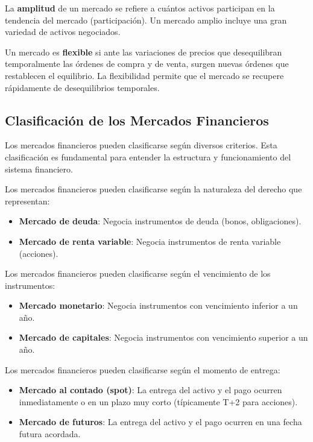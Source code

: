 \begin{definicion}[Amplitud]
La \textbf{amplitud} de un mercado se refiere a cuántos activos participan en la tendencia del mercado (participación). Un mercado amplio incluye una gran variedad de activos negociados.
\end{definicion}

\begin{definicion}[Flexibilidad]
Un mercado es \textbf{flexible} si ante las variaciones de precios que desequilibran temporalmente las órdenes de compra y de venta, surgen nuevas órdenes que restablecen el equilibrio. La flexibilidad permite que el mercado se recupere rápidamente de desequilibrios temporales.
\end{definicion}

\subsection{Clasificación de los Mercados Financieros}

Los mercados financieros pueden clasificarse según diversos criterios. Esta clasificación es fundamental para entender la estructura y funcionamiento del sistema financiero.

\begin{definicion}
Los mercados financieros pueden clasificarse según la naturaleza del derecho que representan:
\begin{itemize}
\item \textbf{Mercado de deuda}: Negocia instrumentos de deuda (bonos, obligaciones).
\item \textbf{Mercado de renta variable}: Negocia instrumentos de renta variable (acciones).
\end{itemize}
\end{definicion}

\begin{definicion}
Los mercados financieros pueden clasificarse según el vencimiento de los instrumentos:
\begin{itemize}
\item \textbf{Mercado monetario}: Negocia instrumentos con vencimiento inferior a un año.
\item \textbf{Mercado de capitales}: Negocia instrumentos con vencimiento superior a un año.
\end{itemize}
\end{definicion}

\begin{definicion}
Los mercados financieros pueden clasificarse según el momento de entrega:
\begin{itemize}
\item \textbf{Mercado al contado (spot)}: La entrega del activo y el pago ocurren inmediatamente o en un plazo muy corto (típicamente T+2 para acciones).
\item \textbf{Mercado de futuros}: La entrega del activo y el pago ocurren en una fecha futura acordada.
\end{itemize}
\end{definicion}

